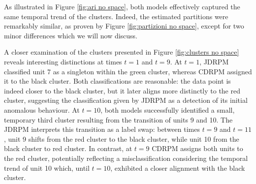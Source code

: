 \documentclass[12pt,	%
	a4paper,		%
	twoside,		%
	openright,		%
	titlepage,%
	]{book}
\theoremstyle{definition}
\let\cite\citep
\newcommand{\mjline}[1]{\texttt{#1}}
\begin{document}



As illustrated in Figure \ref{fig:ari no space}, both models effectively captured the same temporal trend of the clusters. Indeed, the estimated partitions were remarkably similar, as proven by Figure \ref{fig:partizioni no space}, except for two minor differences which we will now discuss. 

A closer examination of the clusters presented in Figure \ref{fig:clusters no space} reveals interesting distinctions at times $t=1$ and $t=9$. At $t=1$, JDRPM classified unit 7 as a singleton within the green cluster, whereas CDRPM assigned it to the black cluster. Both classifications are reasonable: the data point is indeed closer to the black cluster, but it later aligns more distinctly to the red cluster, suggesting the classification given by JDRPM as a detection of its initial anomalous behaviour. At $t=10$, both models successfully identified a small, temporary third cluster resulting from the transition of units 9 and 10. The JDRPM interprets this transition as a label swap: between times $t=9$ and $t=11$, unit 9 shifts from the red cluster to the black cluster, while unit 10 from the black cluster to red cluster. In contrast, at $t=9$ CDRPM assigns both units to the red cluster, potentially reflecting a misclassification considering the temporal trend of unit 10 which, until $t=10$, exhibited a closer alignment with the black cluster.

\end{document}
